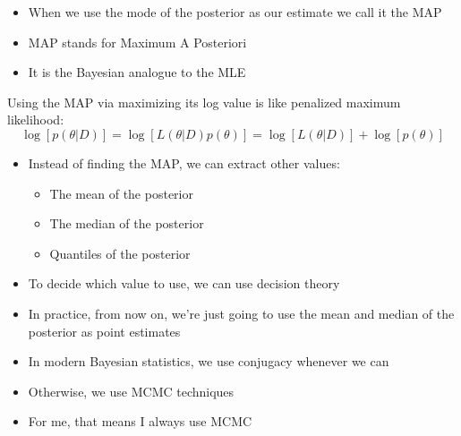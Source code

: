 \documentclass{beamer}
\begin{document}
\frame
{
  \begin{itemize}
    \item{When we use the mode of the posterior as our estimate we call it the MAP}
    \item{MAP stands for Maximum A Posteriori}
    \item{It is the Bayesian analogue to the MLE}
  \end{itemize}
}




\frame
{
Using the MAP via maximizing its log value is like penalized maximum likelihood:
\[
\log[p(\theta | D)] = \log[L(\theta | D) p(\theta)] = \log[L(\theta | D)] + \log[p(\theta)]
\]
}


\frame
{
\begin{itemize}
\item{Instead of finding the MAP, we can extract other values:}
\begin{itemize}
  \item{The mean of the posterior}
  \item{The median of the posterior}
  \item{Quantiles of the posterior}
\end{itemize}
\item{To decide which value to use, we can use decision theory}
\end{itemize}
}

\frame
{
  \begin{itemize}
    \item{In practice, from now on, we're just going to use the mean and median of the posterior as point estimates}
  \end{itemize}
}

%

\begin{frame}
  \begin{itemize}
    \item{In modern Bayesian statistics, we use conjugacy whenever we can}
    \item{Otherwise, we use MCMC techniques}
    \item{For me, that means I always use MCMC}
  \end{itemize}
\end{frame}
\end{document}
